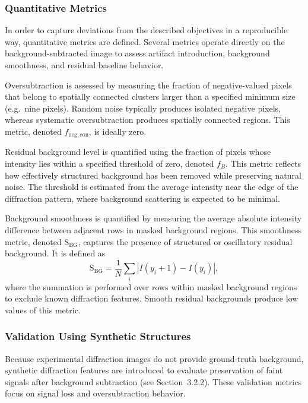 \documentclass[iucr]{iucrjournals}
\begin{document}
\subsubsection{Quantitative Metrics}

In order to capture deviations from the described objectives in a reproducible way, quantitative metrics are defined. Several metrics operate directly on the background-subtracted image to assess artifact introduction, background smoothness, and residual baseline behavior.

Oversubtraction is assessed by measuring the fraction of negative-valued pixels that belong to spatially connected clusters larger than a specified minimum size (e.g.\ nine pixels). Random noise typically produces isolated negative pixels, whereas systematic oversubtraction produces spatially connected regions. This metric, denoted $f_{\mathrm{neg,con}}$, is ideally zero.

Residual background level is quantified using the fraction of pixels whose intensity lies within a specified threshold of zero, denoted $f_{B}$. This metric reflects how effectively structured background has been removed while preserving natural noise. The threshold is estimated from the average intensity near the edge of the diffraction pattern, where background scattering is expected to be minimal.

Background smoothness is quantified by measuring the average absolute intensity difference between adjacent rows in masked background regions. This smoothness metric, denoted $\mathrm{S}_{\mathrm{BG}}$, captures the presence of structured or oscillatory residual background. It is defined as
\begin{equation}
\mathrm{S}_{\mathrm{BG}} =
\frac{1}{N} \sum_i \left| I(y_i + 1) - I(y_i) \right|,
\end{equation}
where the summation is performed over rows within masked background regions to exclude known diffraction features. Smooth residual backgrounds produce low values of this metric.

\subsubsection{Validation Using Synthetic Structures}

Because experimental diffraction images do not provide ground-truth background, synthetic diffraction features are introduced to evaluate preservation of faint signals after background subtraction (see Section~3.2.2). These validation metrics focus on signal loss and oversubtraction behavior.
\end{document}
